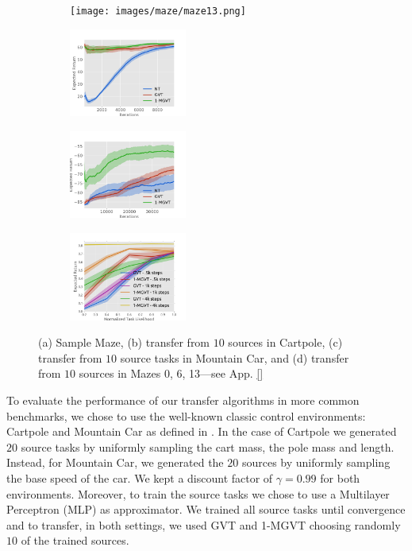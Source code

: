 \documentclass{article}
\begin{document}
\begin{figure}[t]
  \begin{subfigure}[b]{0.15\textwidth}
    \texttt{[image: images/maze/maze13.png]}
    \caption{}
  \end{subfigure}
  \begin{subfigure}[b]{0.27\textwidth}
    \includegraphics[trim=0.5cm 0cm 1.8cm 1.3cm,clip=true,height=2.9cm]{images/cartpole/lrev.pdf}
    \caption{}
  \end{subfigure}
    \begin{subfigure}[b]{0.27\textwidth}
    \includegraphics[trim=0.5cm 0cm 1.6cm 1.3cm,clip=true,height=2.9cm]{images/mountaincar/lrev.pdf}
    \caption{}
  \end{subfigure}
    \begin{subfigure}[b]{0.27\textwidth}
    \includegraphics[trim=0.5cm 0cm 1.6cm 1.3cm,clip=true,height=2.9cm]{images/likelihood/lrew.pdf}
    \caption{}
  \end{subfigure}
  \caption{(a) Sample Maze, (b) transfer from $10$ sources in Cartpole, (c) transfer from $10$ source tasks in Mountain Car, and (d) transfer from $10$ sources in Mazes 0, 6, 13---see App. \ref{}}
  \label{fig:ccmazeplots}
\end{figure}

To evaluate the performance of our transfer algorithms in more common benchmarks, we chose to use the well-known classic control environments: Cartpole and Mountain Car as defined in \citep{sutton1998reinforcement}. In the case of Cartpole we generated $20$ source tasks by uniformly sampling the cart mass, the pole mass and length. Instead, for Mountain Car, we generated the $20$ sources by uniformly sampling the base speed of the car. We kept a discount factor of $\gamma=0.99$ for both environments. Moreover, to train the source tasks we chose to use a Multilayer Perceptron (MLP) as approximator. We trained all source tasks until convergence and to transfer, in both settings, we used GVT and 1-MGVT choosing randomly $10$ of the trained sources.
\end{document}

